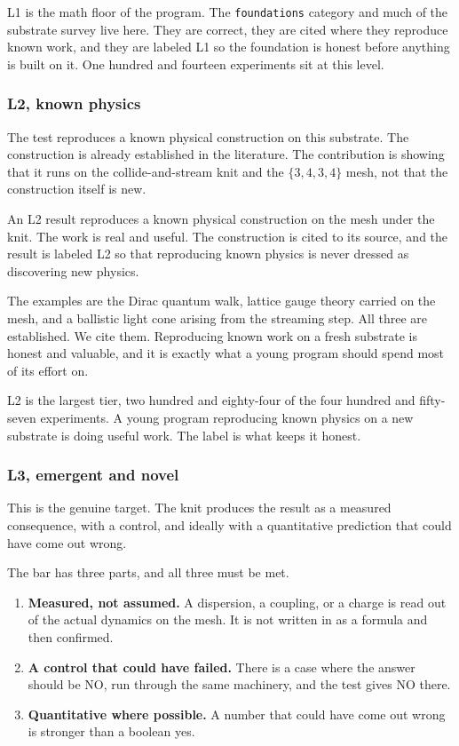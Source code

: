L1 is the math floor of the program. The \texttt{foundations} category and much of the substrate survey live here. They are correct, they are cited where they reproduce known work, and they are labeled L1 so the foundation is honest before anything is built on it. One hundred and fourteen experiments sit at this level.

\subsubsection{L2, known physics}

The test reproduces a known physical construction on this substrate. The construction is already established in the literature. The contribution is showing that it runs on the collide-and-stream knit and the $\{3,4,3,4\}$ mesh, not that the construction itself is new.

\begin{result}
An L2 result reproduces a known physical construction on the mesh under the knit. The work is real and useful. The construction is cited to its source, and the result is labeled L2 so that reproducing known physics is never dressed as discovering new physics.
\end{result}

The examples are the Dirac quantum walk, lattice gauge theory carried on the mesh, and a ballistic light cone arising from the streaming step. All three are established. We cite them. Reproducing known work on a fresh substrate is honest and valuable, and it is exactly what a young program should spend most of its effort on.

L2 is the largest tier, two hundred and eighty-four of the four hundred and fifty-seven experiments. A young program reproducing known physics on a new substrate is doing useful work. The label is what keeps it honest.

\subsubsection{L3, emergent and novel}

This is the genuine target. The knit produces the result as a measured consequence, with a control, and ideally with a quantitative prediction that could have come out wrong.

The bar has three parts, and all three must be met.

\begin{enumerate}
\item \textbf{Measured, not assumed.} A dispersion, a coupling, or a charge is read out of the actual dynamics on the mesh. It is not written in as a formula and then confirmed.
\item \textbf{A control that could have failed.} There is a case where the answer should be NO, run through the same machinery, and the test gives NO there.
\item \textbf{Quantitative where possible.} A number that could have come out wrong is stronger than a boolean yes.
\end{enumerate}

